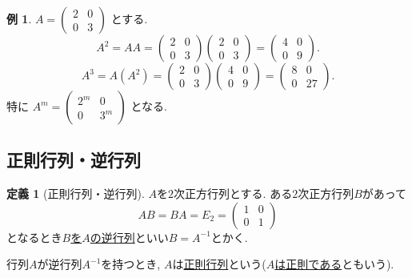 \documentclass[dvipdfmx,a4paper,11pt]{article}
\theoremstyle{definition}
\newtheorem{dfn}[thm]{定義}
\newtheorem{exa}[thm]{例}
\begin{document}
  \begin{exa}
  $ A= 
 \begin{pmatrix}
2& 0\\
0 & 3
 \end{pmatrix}
$ とする. 
 $$
 A^2 =
 AA 
 =
 \begin{pmatrix}
2& 0\\
0 & 3
 \end{pmatrix}
 \begin{pmatrix}
2& 0\\
0 & 3
 \end{pmatrix}
 =  
 \begin{pmatrix}
4& 0\\
0 & 9
 \end{pmatrix}.
 $$
  $$
 A^3 =
 A(A^2) 
 =
 \begin{pmatrix}
2& 0\\
0 & 3
 \end{pmatrix}
 \begin{pmatrix}
4& 0\\
0 & 9
 \end{pmatrix}
 =  
 \begin{pmatrix}
8& 0\\
0 & 27
 \end{pmatrix}.
 $$
特に
  $
 A^m 
 =
 \begin{pmatrix}
2^m& 0\\
0 & 3^m
 \end{pmatrix}
 $
 となる. 


 \end{exa}

\subsection{正則行列・逆行列}

\begin{tcolorbox}[
    colback = white,
    colframe = green!35!black,
    fonttitle = \bfseries,
    breakable = true]
    \begin{dfn}[正則行列・逆行列]
$A$を$2$次正方行列とする.
 ある$2$次正方行列$B$があって
 $$
 AB =BA =E_{2}
 = 
  \begin{pmatrix}
1& 0\\
0 &1
 \end{pmatrix}%
 $$
 となるとき\underline{$B$を$A$の逆行列}といい$B=A^{-1}$とかく.
 
 行列$A$が逆行列$A^{-1}$を持つとき, $A$は\underline{正則行列}という(\underline{$A$は正則である}ともいう).
  \end{dfn}
 \end{tcolorbox}
 
\end{document}
